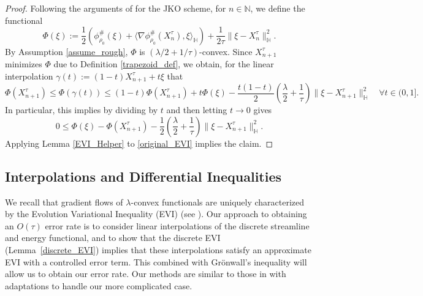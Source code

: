 \documentclass[11pt,a4paper]{amsart}
\newcommand{\1}{\mathds{1}}
\numberwithin{equation}{section}
\begin{document}
\begin{proof} 
Following the arguments of \cite{ambrosio2005gradient} for the JKO scheme, for $n \in \mathbb{N}$, we define the functional
\[
\Phi(\xi) := \frac{1}{2} \left( \phi^{\#}_{\rho_0}(\xi) + \langle \nabla \phi^{\#}_{\rho_0}(X_n^{\tau}), \xi \rangle_{\mathbb{H}} \right) + \frac{1}{2 \tau} \|\xi - X_n^{\tau}\|^2_{\mathbb{H}}.
\] 
By Assumption \ref{assume_rough}, $\Phi$ is $(\lambda/2 + 1/\tau)$-convex. Since $X^{\tau}_{n+1}$ minimizes $\Phi$ due to Definition \ref{trapezoid_def}, we obtain, for the linear interpolation $\gamma(t) := (1-t) X^{\tau}_{n+1} + t \xi$ that
\[
\Phi(X^{\tau}_{n+1}) \leq \Phi(\gamma(t)) \leq (1-t) \Phi(X^{\tau}_{n+1}) + t \Phi(\xi) - \frac{t(1-t)}{2} \left( \frac{\lambda}{2} + \frac{1}{\tau} \right) \|\xi - X^{\tau}_{n+1}\|^2_{\mathbb{H}} \quad \forall t \in(0,1].
\] 
In particular, this implies by dividing by $t$ and then letting $t \rightarrow 0$ gives
\begin{equation} \label{original_EVI}
0 \leq \Phi(\xi) - \Phi(X^{\tau}_{n+1}) - \frac{1}{2} \left( \frac{\lambda}{2} + \frac{1}{\tau} \right) \|\xi - X^{\tau}_{n+1}\|^2_{\mathbb{H}}. 
\end{equation}
Applying Lemma \ref{EVI_Helper} to \eqref{original_EVI} implies the claim.
\end{proof}

\subsection{Interpolations and Differential Inequalities}

We recall that gradient flows of $\lambda$-convex functionals are uniquely characterized by the Evolution Variational Inequality (EVI) (see \cite{ambrosio2005gradient}). Our approach to obtaining an $O(\tau)$ error rate is to consider linear interpolations of the discrete streamline and energy functional, and to show that the discrete EVI (Lemma~\ref{discrete_EVI}) implies that these interpolations satisfy an approximate EVI with a controlled error term. This combined with Grönwall's inequality will allow us to obtain our error rate. Our methods are similar to those in \cite{ambrosio2005gradient} with adaptations to handle our more complicated case. 
\end{document}
